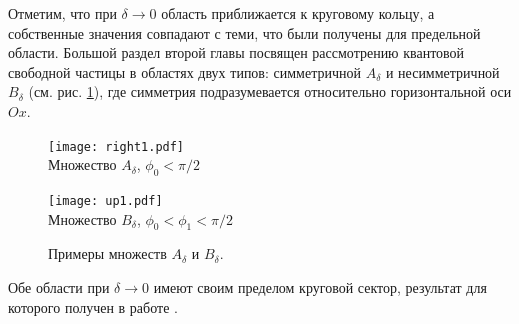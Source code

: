 Отметим, что при $\delta \to 0$ область приближается к круговому кольцу, а собственные значения совпадают с теми, что были получены для предельной области. 
Большой раздел второй главы посвящен рассмотрению квантовой свободной частицы в областях двух типов: симметричной $A_\delta$ и несимметричной $B_\delta$ (см. рис. \ref{fig:intro_AB_examples}), где симметрия подразумевается относительно горизонтальной оси $Ox$. 
\begin{figure}[ht]
    \begin{minipage}[b][][b]{0.49\linewidth}\centering
        \texttt{[image: right1.pdf]} \\ 
        Множество $A_\delta$, $\phi_0<\pi/2$
    \end{minipage}
    \hfill
    \begin{minipage}[b][][b]{0.49\linewidth}\centering
        \texttt{[image: up1.pdf]}  \\
        Множество $B_\delta$, $\phi_0<\phi_1<\pi/2$
    \end{minipage}
\caption{Примеры множеств $A_\delta$ и $B_\delta$.}
\label{fig:intro_AB_examples}
\end{figure}
Обе области при $\delta \to 0$ имеют своим пределом круговой сектор, результат для которого получен в работе \cite{wref13}.

